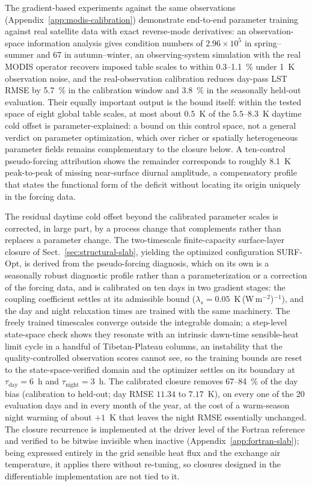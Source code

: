\documentclass[gmd, manuscript]{copernicus}
\begin{document}
The gradient-based experiments against the same observations
(Appendix~\ref{app:modis-calibration}) demonstrate end-to-end parameter
training against real satellite data with exact reverse-mode derivatives: an
observation-space information analysis gives condition numbers of
$2.96\times10^{5}$ in spring--summer and 67 in autumn--winter, an
observing-system simulation with the real MODIS operator recovers imposed
table scales to within 0.3--1.1~\% under 1~K observation noise, and the
real-observation calibration reduces day-pass LST RMSE by 5.7~\% in the
calibration window
and 3.8~\% in the seasonally held-out evaluation. Their equally important
output is the bound itself: within the tested space of eight global table
scales, at most about $0.5$~K of the
$5.5$--$8.3$~K daytime cold offset is parameter-explained: a bound on this
control space, not a general verdict on parameter optimization, which over
richer or spatially heterogeneous parameter fields remains complementary to
the closure below. A ten-control pseudo-forcing
attribution shows the remainder corresponds to
roughly 8.1~K peak-to-peak of missing near-surface diurnal amplitude, a
compensatory profile that states the functional form of the deficit without
locating its origin uniquely in the forcing data.

The residual daytime cold offset beyond the calibrated parameter scales is
corrected, in large part, by a process change that complements rather than
replaces a parameter change. The two-timescale finite-capacity surface-layer closure of
Sect.~\ref{sec:structural-slab}, yielding the optimized configuration
SURF-Opt, is derived from the pseudo-forcing
diagnosis, which on its own is a seasonally robust diagnostic profile
rather than a parameterization or a correction of the forcing data, and is calibrated on ten days in two gradient stages: the
coupling coefficient settles at its admissible bound
($\lambda_s = 0.05$~K\,(W\,m$^{-2}$)$^{-1}$), and the day and night
relaxation times are trained with the same machinery. The freely trained
timescales converge outside the integrable domain; a step-level
state-space check shows they resonate with an intrinsic dawn-time
sensible-heat limit cycle in a handful of Tibetan-Plateau columns, an
instability that the quality-controlled observation scores cannot see,
so the training bounds are reset to the state-space-verified domain and
the optimizer settles on its boundary at $\tau_{\mathrm{day}} = 6$~h and
$\tau_{\mathrm{night}} = 3$~h. The calibrated closure removes 67--84~\% of
the day bias (calibration to held-out; day RMSE $11.34$ to $7.17$~K), on
every one of the 20 evaluation days and in every month of the year, at the
cost of a warm-season night warming of about $+1$~K that leaves the night
RMSE essentially unchanged. The closure recurrence is implemented at the
driver level of the Fortran reference and verified to be bitwise invisible
when inactive (Appendix~\ref{app:fortran-slab}); being expressed entirely
in the grid sensible heat flux and the exchange air temperature, it applies
there without re-tuning, so closures designed in the differentiable
implementation are not tied to it.
\end{document}
